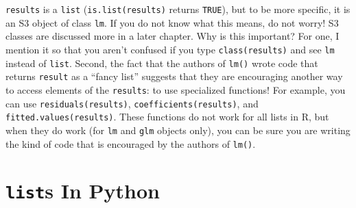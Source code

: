 \documentclass[
  12pt,
  krantz2]{krantz}
\makeatletter
\newenvironment{Shaded}{\begin{snugshade}}{\end{snugshade}}
\newcommand{\AttributeTok}[1]{\textcolor[rgb]{0.61,0.61,0.61}{#1}}
\newcommand{\DocumentationTok}[1]{\textcolor[rgb]{0.37,0.37,0.37}{\textbf{\textit{#1}}}}
\newcommand{\FunctionTok}[1]{\textcolor[rgb]{0,0,0}{#1}}
\newcommand{\NormalTok}[1]{#1}
\newcommand{\OtherTok}[1]{\textcolor[rgb]{0.37,0.37,0.37}{#1}}
\newcommand{\SpecialCharTok}[1]{\textcolor[rgb]{0,0,0}{#1}}
\newcommand{\StringTok}[1]{\textcolor[rgb]{0.5,0.5,0.5}{#1}}
\newenvironment{kframe}{%
\medskip{}
\setlength{\fboxsep}{.8em}
 \def\at@end@of@kframe{}%
 \ifinner\ifhmode%
  \def\at@end@of@kframe{\end{minipage}}%
  \begin{minipage}{\columnwidth}%
 \fi\fi%
 \def\FrameCommand##1{\hskip\@totalleftmargin \hskip-\fboxsep
 \colorbox{shadecolor}{##1}\hskip-\fboxsep
     \hskip-\linewidth \hskip-\@totalleftmargin \hskip\columnwidth}%
 \MakeFramed {\advance\hsize-\width
   \@totalleftmargin\z@ \linewidth\hsize
   \@setminipage}}%
 {\par\unskip\endMakeFramed%
 \at@end@of@kframe}
\renewenvironment{Shaded}{\begin{kframe}}{\end{kframe}}
\makeatother
\begin{document}
\begin{Shaded}
\end{Shaded}

\texttt{results} is a \texttt{list} (\texttt{is.list(results)} returns \texttt{TRUE}), but to be more specific, it is an S3 object of class \texttt{lm}. If you do not know what this means, do not worry! S3 classes are discussed more in a later chapter. Why is this important? For one, I mention it so that you aren't confused if you type \texttt{class(results)} and see \texttt{lm} instead of \texttt{list}. Second, the fact that the authors of \texttt{lm()} wrote code that returns \texttt{result} as a ``fancy list'' suggests that they are encouraging another way to access elements of the \texttt{results}: to use specialized functions! For example, you can use \texttt{residuals(results)}, \texttt{coefficients(results)}, and \texttt{fitted.values(results)}. These functions do not work for all lists in R, but when they do work (for \texttt{lm} and \texttt{glm} objects only), you can be sure you are writing the kind of code that is encouraged by the authors of \texttt{lm()}.

\hypertarget{lists-in-python}{%
\section{\texorpdfstring{\texttt{list}s In Python}{lists In Python}}\label{lists-in-python}}
\end{document}
